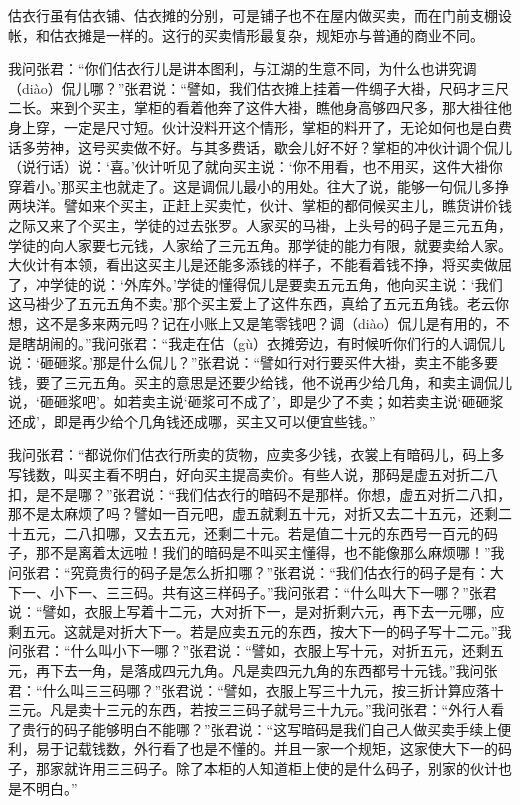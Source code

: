 \documentclass[12pt,UTF8]{ctexbook}
\begin{document}
估衣行虽有估衣铺、估衣摊的分别，可是铺子也不在屋内做买卖，而在门前支棚设帐，和估衣摊是一样的。这行的买卖情形最复杂，规矩亦与普通的商业不同。



我问张君：“你们估衣行儿是讲本图利，与江湖的生意不同，为什么也讲究调（diào）侃儿哪？”张君说：“譬如，我们估衣摊上挂着一件绸子大褂，尺码才三尺二长。来到个买主，掌柜的看着他奔了这件大褂，瞧他身高够四尺多，那大褂往他身上穿，一定是尺寸短。伙计没料开这个情形，掌柜的料开了，无论如何也是白费话多劳神，这号买卖做不好。与其多费话，歇会儿好不好？掌柜的冲伙计调个侃儿（说行话）说：‘喜。’伙计听见了就向买主说：‘你不用看，也不用买，这件大褂你穿着小。’那买主也就走了。这是调侃儿最小的用处。往大了说，能够一句侃儿多挣两块洋。譬如来个买主，正赶上买卖忙，伙计、掌柜的都伺候买主儿，瞧货讲价钱之际又来了个买主，学徒的过去张罗。人家买的马褂，上头号的码子是三元五角，学徒的向人家要七元钱，人家给了三元五角。那学徒的能力有限，就要卖给人家。大伙计有本领，看出这买主儿是还能多添钱的样子，不能看着钱不挣，将买卖做屈了，冲学徒的说：‘外库外。’学徒的懂得侃儿是要卖五元五角，他向买主说：‘我们这马褂少了五元五角不卖。’那个买主爱上了这件东西，真给了五元五角钱。老云你想，这不是多来两元吗？记在小账上又是笔零钱吧？调（diào）侃儿是有用的，不是瞎胡闹的。”我问张君：“我走在估（gù）衣摊旁边，有时候听你们行的人调侃儿说：‘砸砸浆。’那是什么侃儿？”张君说：“譬如行对行要买件大褂，卖主不能多要钱，要了三元五角。买主的意思是还要少给钱，他不说再少给几角，和卖主调侃儿说，‘砸砸浆吧’。如若卖主说‘砸浆可不成了’，即是少了不卖；如若卖主说‘砸砸浆还成’，即是再少给个几角钱还成哪，买主又可以便宜些钱。”

我问张君：“都说你们估衣行所卖的货物，应卖多少钱，衣裳上有暗码儿，码上多写钱数，叫买主看不明白，好向买主提高卖价。有些人说，那码是虚五对折二八扣，是不是哪？”张君说：“我们估衣行的暗码不是那样。你想，虚五对折二八扣，那不是太麻烦了吗？譬如一百元吧，虚五就剩五十元，对折又去二十五元，还剩二十五元，二八扣哪，又去五元，还剩二十元。若是值二十元的东西号一百元的码子，那不是离着太远啦！我们的暗码是不叫买主懂得，也不能像那么麻烦哪！”我问张君：“究竟贵行的码子是怎么折扣哪？”张君说：“我们估衣行的码子是有：大下一、小下一、三三码。共有这三样码子。”我问张君：“什么叫大下一哪？”张君说：“譬如，衣服上写着十二元，大对折下一，是对折剩六元，再下去一元哪，应剩五元。这就是对折大下一。若是应卖五元的东西，按大下一的码子写十二元。”我问张君：“什么叫小下一哪？”张君说：“譬如，衣服上写十元，对折五元，还剩五元，再下去一角，是落成四元九角。凡是卖四元九角的东西都号十元钱。”我问张君：“什么叫三三码哪？”张君说：“譬如，衣服上写三十九元，按三折计算应落十三元。凡是卖十三元的东西，若按三三码子就号三十九元。”我问张君：“外行人看了贵行的码子能够明白不能哪？”张君说：“这写暗码是我们自己人做买卖手续上便利，易于记载钱数，外行看了也是不懂的。并且一家一个规矩，这家使大下一的码子，那家就许用三三码子。除了本柜的人知道柜上使的是什么码子，别家的伙计也是不明白。”
\end{document}
